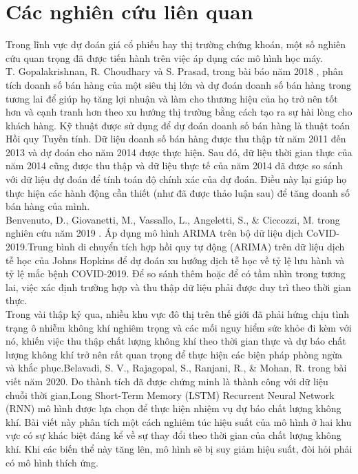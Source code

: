\documentclass[conference]{IEEEtran}
\begin{document}
\section{Các nghiên cứu liên quan}
Trong lĩnh vực dự đoán giá cổ phiếu hay thị trường chứng khoán, một số nghiên cứu quan trọng đã được tiến hành trên việc áp dụng các mô hình học máy.\\
T. Gopalakrishnan, R. Choudhary và S. Prasad, trong bài báo năm 2018 \cite{b1}, phân tích doanh số bán hàng của một siêu thị lớn và dự đoán doanh số bán hàng trong tương lai để giúp họ tăng lợi nhuận và làm cho thương hiệu của họ trở nên tốt hơn và cạnh tranh hơn theo xu hướng thị trường bằng cách tạo ra sự hài lòng cho khách hàng. Kỹ thuật được sử dụng để dự đoán doanh số bán hàng là thuật toán Hồi quy Tuyến tính. Dữ liệu doanh số bán hàng được thu thập từ năm 2011 đến 2013 và dự đoán cho năm 2014 được thực hiện. Sau đó, dữ liệu thời gian thực của năm 2014 cũng được thu thập và dữ liệu thực tế của năm 2014 đã được so sánh với dữ liệu dự đoán để tính toán độ chính xác của dự đoán. Điều này lại giúp họ thực hiện các hành động cần thiết (như đã được thảo luận sau) để tăng doanh số bán hàng của mình.\\
Benvenuto, D., Giovanetti, M., Vassallo, L., Angeletti, S., & Ciccozzi, M. trong nghiên cứu năm 2019 \cite{b2}. Áp dụng mô hình ARIMA trên bộ dữ liệu dịch CoVID-2019.Trung bình di chuyển tích hợp hồi quy tự động (ARIMA) trên dữ liệu dịch tễ học của Johns Hopkins để dự đoán xu hướng dịch tễ học về tỷ lệ lưu hành và tỷ lệ mắc bệnh COVID-2019. Để so sánh thêm hoặc để có tầm nhìn trong tương lai, việc xác định trường hợp và thu thập dữ liệu phải được duy trì theo thời gian thực.\\
Trong vài thập kỷ qua, nhiều khu vực đô thị trên thế giới đã phải hứng chịu tình trạng ô nhiễm không khí nghiêm trọng và các mối nguy hiểm sức khỏe đi kèm với nó, khiến việc thu thập chất lượng không khí theo thời gian thực và dự báo chất lượng không khí trở nên rất quan trọng để thực hiện các biện pháp phòng ngừa và khắc phục.Belavadi, S. V., Rajagopal, S., Ranjani, R., & Mohan, R. trong bài viết năm 2020.\cite{b3} Do thành tích đã được chứng minh là thành công với dữ liệu chuỗi thời gian,Long Short-Term Memory (LSTM) Recurrent Neural Network (RNN) mô hình được lựa chọn để thực hiện nhiệm vụ dự báo chất lượng không khí. Bài viết này phân tích một cách nghiêm túc hiệu suất của mô hình ở hai khu vực có sự khác biệt đáng kể về sự thay đổi theo thời gian của chất lượng không khí. Khi các biến thể này tăng lên, mô hình sẽ bị suy giảm hiệu suất, đòi hỏi phải có mô hình thích ứng.\\
\end{document}
